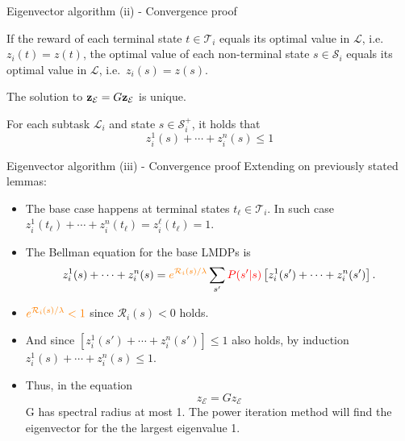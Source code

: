 \documentclass{beamer}
\theoremstyle{mystyle}
\newcommand{\cE}{\mathcal{E}}
\newcommand{\cL}{\mathcal{L}}
\newcommand{\cR}{\mathcal{R}}
\newcommand{\cS}{\mathcal{S}}
\newcommand{\cT}{\mathcal{T}}
\begin{document}
\begin{frame}{Eigenvector algorithm (ii) - Convergence proof}

\begin{lemma}[1]
    If the reward of each terminal state $t\in\cT_i$ equals its optimal value in $\cL$, i.e.~$z_i(t)=z(t)$, the optimal value of each non-terminal state $s\in\cS_i$ equals its optimal value in $\cL$, i.e.~$z_i(s)=z(s)$.
\end{lemma}

\begin{lemma}[2]
    The solution to  ${\bf z}_\cE=G{\bf z}_\cE$ is unique.
\end{lemma}
    

\begin{lemma}[3]
    For each subtask $\cL_i$ and state $s\in\cS_i^+$, it holds that \[ z_i^1(s)+\cdots+z_i^n(s)\leq 1 \]
\end{lemma}

\end{frame}

\begin{frame}{Eigenvector algorithm (iii) - Convergence proof}
Extending on previously stated lemmas:
\begin{itemize}
    \item The base case happens at terminal states $t_\ell\in\cT_i$. In such case $z_i^1(t_\ell)+\cdots+z_i^n(t_\ell) = z_i^\ell(t_\ell) = 1$.
    \item The Bellman equation for the base LMDPs is \[
    z_i^1(s)+\cdots+z_i^n(s)=
    {\color{orange} e^{\cR_i(s)/\lambda}}
    \sum_{s'}{\color{red} P(s'|s)}\left[z_i^1(s')+\cdots+z_i^n(s')\right].
    \]

\item ${\color{orange} e^{\cR_i(s)/\lambda} < 1}$ since $\cR_i(s) < 0$ holds.

\item And since $\left[z_i^1(s')+\cdots+z_i^n(s')\right] \leq 1$ also holds, by induction $z_i^1(s)+\cdots+z_i^n(s) \leq 1$.

\item Thus, in the equation\[ z_\cE = G z_\cE \]G has spectral radius at most 1. The power iteration method will find the eigenvector for the the largest eigenvalue 1.



\end{itemize}
    
\end{frame}
\end{document}
